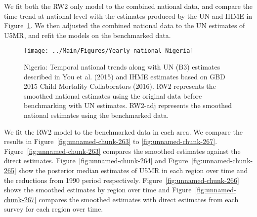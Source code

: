 \documentclass[12pt]{article}\usepackage[]{graphicx}\usepackage[]{color}
\newenvironment{knitrout}{}{} %
\begin{document}
We fit both the RW2 only model to the combined national data, and compare the time trend at national level with the estimates produced by the UN and IHME in Figure~\ref{fig:unnamed-chunk-262}. We then adjusted the combined national data to the UN estimates of U5MR, and refit the models on the benchmarked data. 

\begin{knitrout}
\color{fgcolor}\begin{figure}[bht]

{\centering \texttt{[image: ../Main/Figures/Yearly\_national\_Nigeria]} 

}

\caption[Nigeria]{Nigeria: Temporal national trends along with UN (B3) estimates described in You et al. (2015) and IHME estimates based on GBD 2015 Child Mortality Collaborators (2016). RW2 represents the smoothed national estimates using the original data before benchmarking with UN estimates. RW2-adj represents the smoothed national estimates using the benchmarked data.}\label{fig:unnamed-chunk-262}
\end{figure}


\end{knitrout}
 

We fit the RW2 model to the benchmarked data in each area. 
We compare the results in Figure~\ref{fig:unnamed-chunk-263} to \ref{fig:unnamed-chunk-267}.
Figure~\ref{fig:unnamed-chunk-263} compares the smoothed estimates against the direct estimates. Figure~\ref{fig:unnamed-chunk-264} and Figure~\ref{fig:unnamed-chunk-265} show the posterior median estimates of U5MR in each region over time and the reductions from 1990 period respectively.
Figure~\ref{fig:unnamed-chunk-266} shows the smoothed estimates by region over time and Figure~\ref{fig:unnamed-chunk-267} compares the smoothed estimates with direct estimates from each survey for each region over time.




\end{document}
